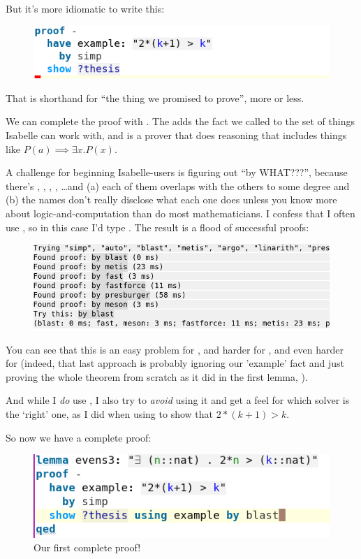 But it's more idiomatic to write this:
\begin{figure}[H]
    \includegraphics[width=0.75\linewidth]{TEXT/C01/Images/good-show.png}
\end{figure}

That  is shorthand for ``the thing we promised to prove'', more or less. 

We can complete the proof with . The  adds the fact we called  to the set of things Isabelle can work with, and  is a prover that does reasoning that includes things like $P(a) \implies \exists x . P(x)$.

A challenge for beginning Isabelle-users is figuring out ``by WHAT???'', because there's , , , , \ldots  and (a) each of them overlaps with the others to some degree and (b) the names don't really disclose what each one does unless you know more about logic-and-computation than do most mathematicians. I confess that I often use , so in this case I'd type . The result is a flood of successful proofs:
\begin{figure}[h]
    \includegraphics[width=0.75\linewidth]{TEXT/C01/Images/flood.png}
\end{figure}

You can see that this is an easy problem for , and harder for , and even harder for  (indeed, that last approach is probably ignoring our 'example' fact and just proving the whole theorem from scratch as it did in the first lemma, ).

And while I \textit{do} use , I also try to \textit{avoid} using it and get a feel for which solver is the `right' one, as I did when using  to show that $2*(k+1) > k.$ 

So now we have a complete proof:
\begin{figure}[h]
    \includegraphics[width=0.75\linewidth]{TEXT/C01/Images/proof1.png}
    \caption{Our first complete proof!}
    \label{fig:first-proof}
\end{figure}

